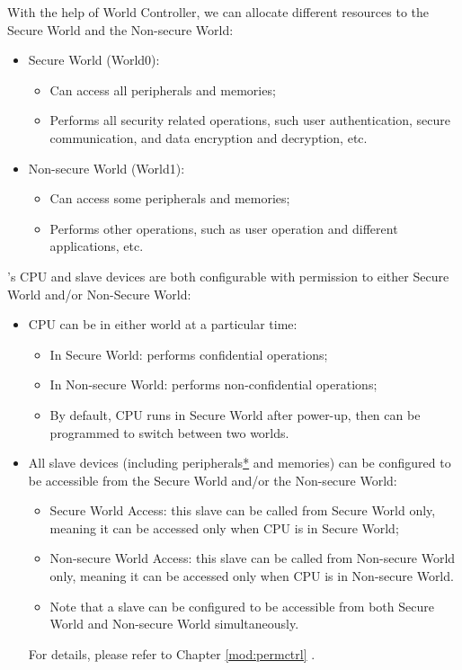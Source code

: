 \documentclass[main\_\_EN.tex]{subfiles}
\begin{document}
With the help of World Controller, we can allocate different resources to the Secure World and the Non-secure World:

\begin{itemize}
    \item Secure World (World0):
    \begin{itemize}
        \item Can access all peripherals and memories;
        \item Performs all security related operations, such user authentication, secure communication, and data encryption and decryption, etc.
    \end{itemize}
    \item Non-secure World (World1):
    \begin{itemize}
        \item Can access some peripherals and memories;
        \item Performs other operations, such as user operation and different applications, etc.
    \end{itemize}
\end{itemize}


\chipname{}'s CPU and slave devices are both configurable with permission to either Secure World and/or Non-Secure World:
\begin{itemize}
    \item CPU can be in either world at a particular time:
        \begin{itemize}
            \item In Secure World: performs confidential operations;
            \item In Non-secure World: performs non-confidential operations;
            \item By default, CPU runs in Secure World after power-up, then can be programmed to switch between two worlds.
        \end{itemize}
    \item All slave devices (including peripherals\hyperref[note:wctrl-access]{*} and memories) can be configured to be accessible from the Secure World and/or the Non-secure World: 
        \begin{itemize}
            \item Secure World Access: this slave can be called from Secure World only, meaning it can be accessed only when CPU is in Secure World;
            \item Non-secure World Access: this slave can be called from Non-secure World only, meaning it can be accessed only when CPU is in Non-secure World.
            \item Note that a slave can be configured to be accessible from both Secure World and Non-secure World simultaneously.
        \end{itemize}
    For details, please refer to Chapter \ref{mod:permctrl} \textit{}. 
\end{itemize}
\end{document}
